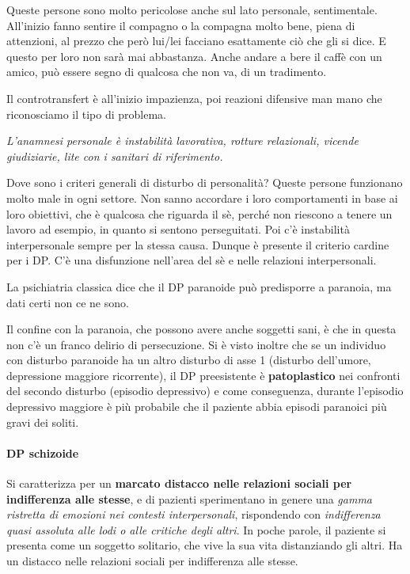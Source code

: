 Queste persone sono molto pericolose anche sul lato personale,
sentimentale. All'inizio fanno sentire il compagno o la compagna molto
bene, piena di attenzioni, al prezzo che però lui/lei facciano
esattamente ciò che gli si dice. E questo per loro non sarà mai
abbastanza. Anche andare a bere il caffè con un amico, può essere segno
di qualcosa che non va, di un tradimento.

Il controtransfert è all'inizio impazienza, poi reazioni difensive man
mano che riconosciamo il tipo di problema.

\emph{\emph{L'anamnesi personale è instabilità lavorativa, rotture
relazionali, vicende giudiziarie, lite con i sanitari di riferimento. }}

Dove sono i criteri generali di disturbo di personalità? Queste persone
funzionano molto male in ogni settore. Non sanno accordare i loro
comportamenti in base ai loro obiettivi, che è qualcosa che riguarda il
sè, perché non riescono a tenere un lavoro ad esempio, in quanto si
sentono perseguitati. Poi c'è instabilità interpersonale sempre per la
stessa causa. Dunque è presente il criterio cardine per i DP. C'è una
disfunzione nell'area del sè e nelle relazioni interpersonali.

La psichiatria classica dice che il DP paranoide può predisporre a
paranoia, ma dati certi non ce ne sono.

Il confine con la paranoia, che possono avere anche soggetti sani, è che
in questa non c'è un franco delirio di persecuzione. Si è visto inoltre
che se un individuo con disturbo paranoide ha un altro disturbo di asse
1 (disturbo dell'umore, depressione maggiore ricorrente), il DP
preesistente è \textbf{patoplastico} nei confronti del secondo disturbo
(episodio depressivo) e come conseguenza, durante l'episodio depressivo
maggiore è più probabile che il paziente abbia episodi paranoici più
gravi dei soliti.

\paragraph{DP schizoide}

Si caratterizza per un \textbf{marcato distacco nelle relazioni sociali
per indifferenza alle stesse}, e di pazienti sperimentano in genere una
\emph{gamma ristretta di emozioni nei contesti interpersonali},
rispondendo con \emph{indifferenza quasi assoluta alle lodi o alle
critiche degli altri}. In poche parole, il paziente si presenta come un
soggetto solitario, che vive la sua vita distanziando gli altri. Ha un
distacco nelle relazioni sociali per indifferenza alle stesse.

